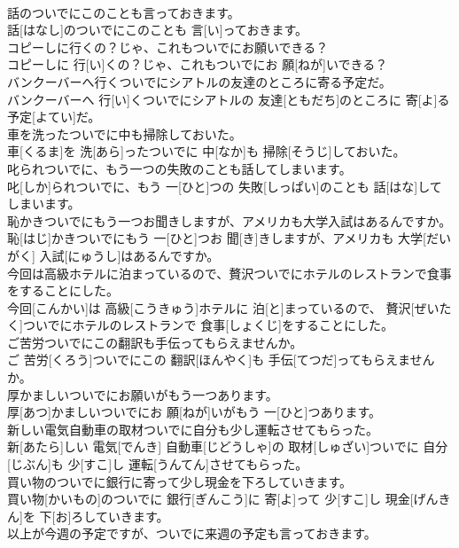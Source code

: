 \documentclass[8pt]{extreport}
\begin{document}
\begin{CJK}{UTF8}{min}
\\	話のついでにこのことも言っておきます。	
\\	話[はなし]のついでにこのことも 言[い]っておきます。
\\	コピーしに行くの？じゃ、これもついでにお願いできる？	
\\	コピーしに 行[い]くの？じゃ、これもついでにお 願[ねが]いできる？
\\	バンクーバーへ行くついでにシアトルの友達のところに寄る予定だ。	
\\	バンクーバーへ 行[い]くついでにシアトルの 友達[ともだち]のところに 寄[よ]る 予定[よてい]だ。
\\	車を洗ったついでに中も掃除しておいた。	
\\	車[くるま]を 洗[あら]ったついでに 中[なか]も 掃除[そうじ]しておいた。
\\	叱られついでに、もう一つの失敗のことも話してしまいます。	
\\	叱[しか]られついでに、もう 一[ひと]つの 失敗[しっぱい]のことも 話[はな]してしまいます。
\\	恥かきついでにもう一つお聞きしますが、アメリカも大学入試はあるんですか。	
\\	恥[はじ]かきついでにもう 一[ひと]つお 聞[き]きしますが、アメリカも 大学[だいがく] 入試[にゅうし]はあるんですか。
\\	今回は高級ホテルに泊まっているので、贅沢ついでにホテルのレストランで食事をすることにした。	
\\	今回[こんかい]は 高級[こうきゅう]ホテルに 泊[と]まっているので、 贅沢[ぜいたく]ついでにホテルのレストランで 食事[しょくじ]をすることにした。
\\	ご苦労ついでにこの翻訳も手伝ってもらえませんか。	
\\	ご 苦労[くろう]ついでにこの 翻訳[ほんやく]も 手伝[てつだ]ってもらえませんか。
\\	厚かましいついでにお願いがもう一つあります。	
\\	厚[あつ]かましいついでにお 願[ねが]いがもう 一[ひと]つあります。
\\	新しい電気自動車の取材ついでに自分も少し運転させてもらった。	
\\	新[あたら]しい 電気[でんき] 自動車[じどうしゃ]の 取材[しゅざい]ついでに 自分[じぶん]も 少[すこ]し 運転[うんてん]させてもらった。
\\	買い物のついでに銀行に寄って少し現金を下ろしていきます。	
\\	買い物[かいもの]のついでに 銀行[ぎんこう]に 寄[よ]って 少[すこ]し 現金[げんきん]を 下[お]ろしていきます。
\\	以上が今週の予定ですが、ついでに来週の予定も言っておきます。	

\end{CJK}
\end{document}
